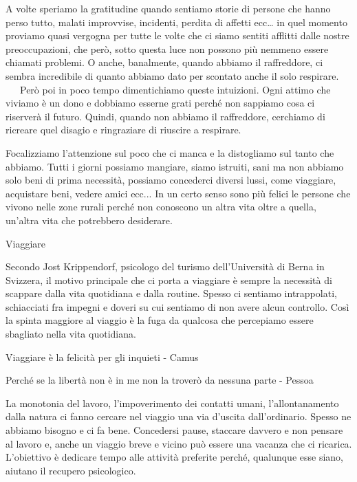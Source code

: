 \documentclass[12pt]{book} %
\begin{document}
A volte speriamo la gratitudine quando sentiamo storie di persone che hanno perso tutto, malati improvvise, incidenti,
perdita di affetti ecc… in quel momento proviamo quasi vergogna per tutte le volte che ci siamo sentiti afflitti dalle
nostre preoccupazioni, che però, sotto questa luce non possono più nemmeno essere chiamati problemi. O anche,
banalmente, quando abbiamo il raffreddore, ci sembra incredibile di quanto abbiamo dato per scontato anche il solo
respirare. \ \ \ Però poi in poco tempo dimentichiamo queste intuizioni. Ogni attimo che viviamo è un dono e dobbiamo
esserne grati perché non sappiamo cosa ci riserverà il futuro. Quindi, quando non abbiamo il raffreddore, cerchiamo di
ricreare quel disagio e ringraziare di riuscire a respirare.

Focalizziamo l'attenzione sul poco che ci manca e la distogliamo sul tanto che abbiamo. Tutti i
giorni possiamo mangiare, siamo istruiti, sani ma non abbiamo solo beni di prima necessità, possiamo concederci diversi
lussi, come viaggiare, acquistare beni, vedere amici ecc... \newline
In un certo senso sono più felici le persone che vivono nelle zone rurali perché non conoscono un altra vita oltre a
quella, un'altra vita che potrebbero desiderare.

\begin{mdframed}[linewidth=1pt]
Viaggiare

Secondo Jost Krippendorf, psicologo del turismo dell'Università di Berna in Svizzera, il motivo principale che ci porta
a viaggiare è sempre la necessità di scappare dalla vita quotidiana e dalla routine. Spesso ci sentiamo intrappolati,
schiacciati fra impegni e doveri su cui sentiamo di non avere alcun controllo. Così la spinta maggiore al viaggio è la
fuga da qualcosa che percepiamo essere sbagliato nella vita quotidiana. 

Viaggiare è la felicità per gli inquieti - Camus

Perché se la libertà non è in me non la troverò da nessuna parte - Pessoa

La monotonia del lavoro, l'impoverimento dei contatti umani, l'allontanamento dalla natura ci fanno cercare nel viaggio
una via d'uscita dall'ordinario. Spesso ne abbiamo bisogno e ci fa bene. Concedersi pause, staccare davvero e non
pensare al lavoro e, anche un viaggio breve e vicino può essere una vacanza che ci ricarica. L{}'obiettivo è dedicare
tempo alle attività preferite perché, qualunque esse siano, aiutano il recupero psicologico. 
\end{mdframed}
\end{document}

